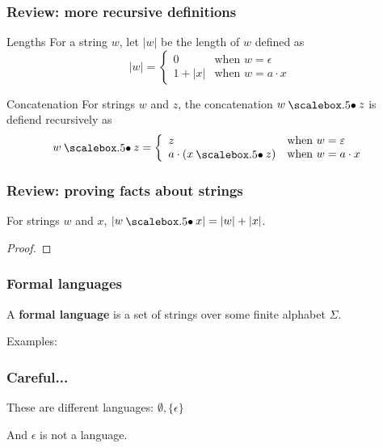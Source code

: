 \begin{frame}
  \frametitle{Review: more recursive definitions}

  \begin{block}{Lengths}
    For a string $w$, let $|w|$ be the length of $w$ defined as
    \[
    |w| = \left\{
    \begin{array}{ll}
      0 & \mbox{when $w=\epsilon$} \\
      1 + |x| & \mbox{when $w=a\cdot x$}
    \end{array}
    \right.
    \]
  \end{block}

  \begin{block}{Concatenation}
    For strings $w$ and $z$, the concatenation $w\sbullet z$ is defiend
    recursively as
    \[
    w\sbullet z = \left\{
    \begin{array}{ll}
      z                   & \mbox{when $w=\epsilon$} \\
      a\cdot(x\sbullet z)  & \mbox{when $w=a\cdot x$}
    \end{array}
    \right.
    \]
  \end{block} 
\end{frame}

\begin{frame}
  \frametitle{Review: proving facts about strings}

  \begin{lemma}
    For strings $w$ and $x$, $|w\sbullet x|=|w|+|x|$.
  \end{lemma}

  \begin{proof}
    \vspace{2in}
  \end{proof}
\end{frame}

\begin{frame}
  \frametitle{Formal languages}

  A {\color{red}\bf formal language} is a set of strings over some
  finite alphabet $\Sigma$.

  Examples:
  \vspace{2.5in}
\end{frame}

\begin{frame}
  \frametitle{Careful...}

  These are different languages: $\emptyset,\{\epsilon\}$

  And $\epsilon$ is not a language.

\end{frame}


